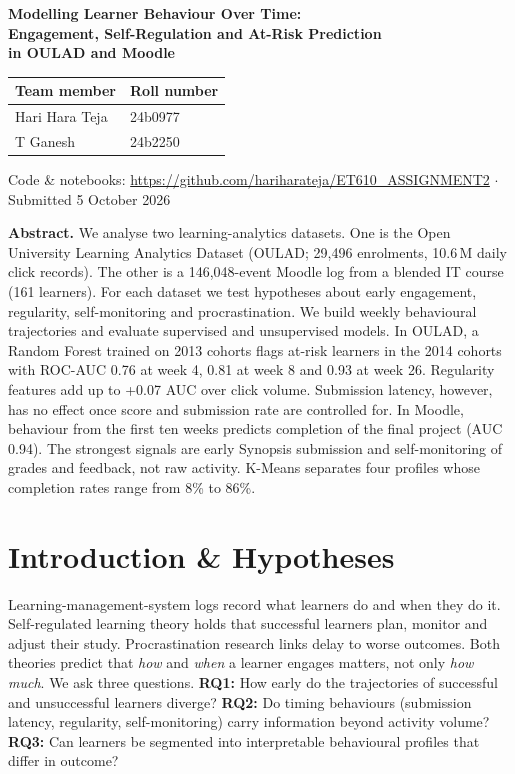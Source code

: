 \documentclass[10pt,a4paper]{article}
\newcommand{\repo}{https://github.com/hariharateja/ET610_ASSIGNMENT2}
\begin{document}
\begin{center}
{\LARGE\bfseries Modelling Learner Behaviour Over Time:\\[2pt]
Engagement, Self-Regulation and At-Risk Prediction\\[2pt] in OULAD and Moodle\par}
\vspace{8pt}
\begin{tabular}{ll}
\toprule
\textbf{Team member} & \textbf{Roll number} \\
\midrule
Hari Hara Teja & 24b0977 \\
T Ganesh & 24b2250 \\
\bottomrule
\end{tabular}

\vspace{4pt}
{\small Code \& notebooks: \url{\repo} \quad$\cdot$\quad Submitted 5 October 2026}
\end{center}

\noindent\textbf{Abstract.} We analyse two learning-analytics datasets. One is the Open University Learning
Analytics Dataset (OULAD; 29,496 enrolments, 10.6\,M daily click records). The other is a 146,048-event Moodle log
from a blended IT course (161 learners). For each dataset we test hypotheses about early engagement, regularity,
self-monitoring and procrastination. We build weekly behavioural trajectories and evaluate supervised and
unsupervised models. In OULAD, a Random Forest trained on 2013 cohorts flags at-risk learners in the 2014 cohorts
with ROC-AUC 0.76 at week 4, 0.81 at week 8 and 0.93 at week 26. Regularity features add up to +0.07 AUC over click
volume. Submission latency, however, has no effect once score and submission rate are controlled for. In Moodle,
behaviour from the first ten weeks predicts completion of the final project (AUC 0.94). The strongest signals are
early Synopsis submission and self-monitoring of grades and feedback, not raw activity. K-Means separates four
profiles whose completion rates range from 8\% to 86\%.

\section{Introduction \& Hypotheses}
Learning-management-system logs record what learners do and when they do it. Self-regulated learning theory
\cite{zimmerman2002} holds that successful learners plan, monitor and adjust their study. Procrastination research
\cite{steel2007} links delay to worse outcomes. Both theories predict that \emph{how} and \emph{when} a learner
engages matters, not only \emph{how much}. We ask three questions.
\textbf{RQ1:} How early do the trajectories of successful and unsuccessful learners diverge?
\textbf{RQ2:} Do timing behaviours (submission latency, regularity, self-monitoring) carry information beyond
activity volume?
\textbf{RQ3:} Can learners be segmented into interpretable behavioural profiles that differ in outcome?
\end{document}
